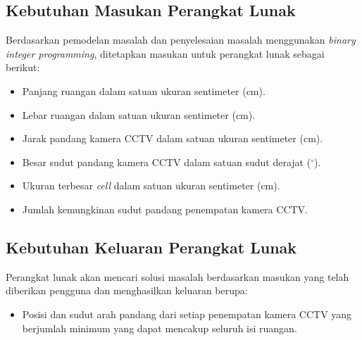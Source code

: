 \begin{itemize}
\end{itemize}

\subsection{Kebutuhan Masukan Perangkat Lunak}
Berdasarkan pemodelan masalah dan penyelesaian masalah menggunakan \textit{binary integer programming}, ditetapkan masukan untuk perangkat lunak sebagai berikut:
\begin{itemize}
	\item Panjang ruangan dalam satuan ukuran sentimeter (cm).
	\item Lebar ruangan dalam satuan ukuran sentimeter (cm).
	\item Jarak pandang kamera CCTV dalam satuan ukuran sentimeter (cm).
	\item Besar sudut pandang kamera CCTV dalam satuan sudut derajat (\(^\circ\)).
	\item Ukuran terbesar \textit{cell} dalam satuan ukuran sentimeter (cm).
	\item Jumlah kemungkinan sudut pandang penempatan kamera CCTV.
\end{itemize}

\subsection{Kebutuhan Keluaran Perangkat Lunak}
Perangkat lunak akan mencari solusi masalah berdasarkan masukan yang telah diberikan pengguna dan menghasilkan keluaran berupa:
\begin{itemize}
	\item Posisi dan sudut arah pandang dari setiap penempatan kamera CCTV yang berjumlah minimum yang dapat mencakup seluruh isi ruangan.
\end{itemize}

